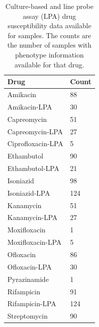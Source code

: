 \begin{table}
\centering
\begin{tabular}{@{}ll@{}}
\toprule
Drug              & Count \\ \midrule
Amikacin          & 88    \\
Amikacin-LPA      & 30    \\
Capreomycin       & 51    \\
Capreomycin-LPA   & 27    \\
Ciprofloxacin-LPA & 5     \\
Ethambutol        & 90    \\
Ethambutol-LPA    & 21    \\
Isoniazid         & 98    \\
Isoniazid-LPA     & 124   \\
Kanamycin         & 51    \\
Kanamycin-LPA     & 27    \\
Moxifloxacin      & 1     \\
Moxifloxacin-LPA  & 5     \\
Ofloxacin         & 86    \\
Ofloxacin-LPA     & 30    \\
Pyrazinamide      & 1     \\
Rifampicin        & 91    \\
Rifampicin-LPA    & 124   \\
Streptomycin      & 90    \\ \bottomrule
\end{tabular}
\caption{Culture-based and line probe assay (LPA) drug susceptibility data available for samples. The counts are the number of samples with phenotype information available for that drug.}
\label{tab:full-dst}
\end{table}

